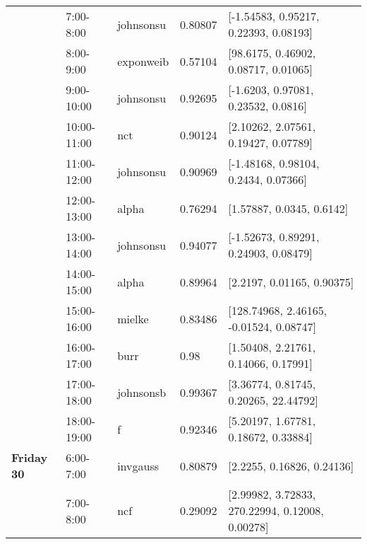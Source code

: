 \begin{longtable}[c]{llllp{5cm}}
\textbf{}             & 7:00-8:00             & johnsonsu             & 0.80807          & {[}-1.54583, 0.95217, 0.22393, 0.08193{]}              \\
\textbf{}             & 8:00-9:00             & exponweib             & 0.57104          & {[}98.6175, 0.46902, 0.08717, 0.01065{]}               \\
\textbf{}             & 9:00-10:00             & johnsonsu             & 0.92695          & {[}-1.6203, 0.97081, 0.23532, 0.0816{]}                \\
\textbf{}             & 10:00-11:00            & nct                   & 0.90124          & {[}2.10262, 2.07561, 0.19427, 0.07789{]}               \\
\textbf{}             & 11:00-12:00            & johnsonsu             & 0.90969          & {[}-1.48168, 0.98104, 0.2434, 0.07366{]}               \\
\textbf{}             & 12:00-13:00            & alpha                 & 0.76294          & {[}1.57887, 0.0345, 0.6142{]}                          \\
\textbf{}             & 13:00-14:00            & johnsonsu             & 0.94077          & {[}-1.52673, 0.89291, 0.24903, 0.08479{]}              \\
\textbf{}             & 14:00-15:00            & alpha                 & 0.89964          & {[}2.2197, 0.01165, 0.90375{]}                         \\
\textbf{}             & 15:00-16:00            & mielke                & 0.83486          & {[}128.74968, 2.46165, -0.01524, 0.08747{]}            \\
\textbf{}             & 16:00-17:00            & burr                  & 0.98             & {[}1.50408, 2.21761, 0.14066, 0.17991{]}               \\
\textbf{}             & 17:00-18:00            & johnsonsb             & 0.99367          & {[}3.36774, 0.81745, 0.20265, 22.44792{]}              \\
\textbf{}             & 18:00-19:00            & f                     & 0.92346          & {[}5.20197, 1.67781, 0.18672, 0.33884{]}               \\ \hline
\textbf{Friday 30}    & 6:00-7:00             & invgauss              & 0.80879          & {[}2.2255, 0.16826, 0.24136{]}                         \\
\textbf{}             & 7:00-8:00             & ncf                   & 0.29092          & {[}2.99982, 3.72833, 270.22994, 0.12008, 0.00278{]}    \\

\end{longtable}
